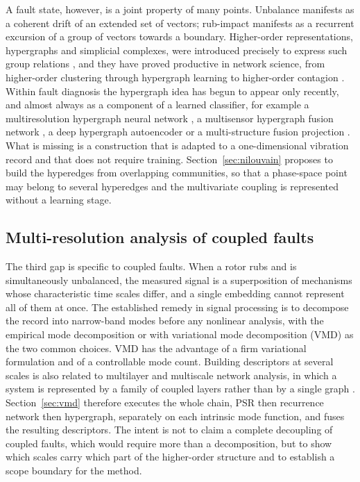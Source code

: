 \documentclass[10pt,a4paper,twocolumn]{article}
\begin{document}
A fault state, however, is a joint property of many points.  Unbalance
manifests as a coherent drift of an extended set of vectors; rub-impact
manifests as a recurrent excursion of a group of vectors towards a boundary.
Higher-order representations, hypergraphs and simplicial complexes, were
introduced precisely to express such group relations
\citep{berge1973,battiston2020,battiston2021}, and they have proved
productive in network science, from higher-order clustering
\citep{benson2016} through hypergraph learning \citep{zhou2006,feng2019} to
higher-order contagion \citep{iacopini2019}.  Within fault diagnosis the
hypergraph idea has begun to appear only recently, and almost always as a
component of a learned classifier, for example a multiresolution hypergraph
neural network \citep{yan2022}, a multisensor hypergraph fusion network
\citep{yan2024}, a deep hypergraph autoencoder \citep{shi2023} or a
multi-structure fusion projection \citep{su2023}.  What is missing is a
construction that is adapted to a one-dimensional vibration record and that
does not require training.  Section~\ref{sec:nilouvain} proposes to build the
hyperedges from overlapping communities, so that a phase-space point may
belong to several hyperedges and the multivariate coupling is represented
without a learning stage.

\subsection{Multi-resolution analysis of coupled faults}

The third gap is specific to coupled faults.  When a rotor rubs and is
simultaneously unbalanced, the measured signal is a superposition of
mechanisms whose characteristic time scales differ, and a single embedding
cannot represent all of them at once.  The established remedy in signal
processing is to decompose the record into narrow-band modes before any
nonlinear analysis, with the empirical mode decomposition
\citep{huang1998,lei2013} or with variational mode decomposition (VMD)
\citep{dragomiretskiy2014,wang2015vmd} as the two common choices.  VMD has
the advantage of a firm variational formulation and of a controllable mode
count.  Building descriptors at several scales is also related to multilayer
and multiscale network analysis, in which a system is represented by a family
of coupled layers rather than by a single graph \citep{boccaletti2014}.
Section~\ref{sec:vmd} therefore executes the whole chain, PSR then
recurrence network then hypergraph, separately on each intrinsic mode
function, and fuses the resulting descriptors.  The intent is not to claim a
complete decoupling of coupled faults, which would require more than a
decomposition, but to show which scales carry which part of the higher-order
structure and to establish a scope boundary for the method.
\end{document}
